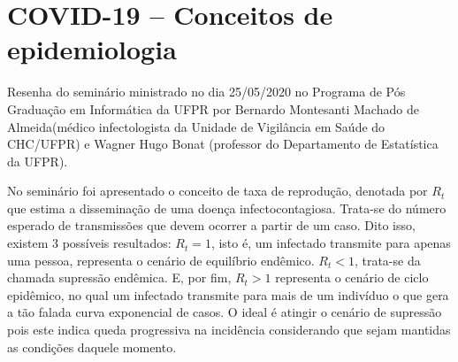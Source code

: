 \documentclass[
	12pt,				%
	openright,			%
	twoside,			%
	a4paper,			%
	english,			%
	brazil,				%
	svgnames
	]{abntex2}\usepackage[]{graphicx}\usepackage[]{color}
\newcommand{\listofquadrosname}{Lista de quadros}
\begin{document}



\tableofcontents*
\cleardoublepage

\textual

\chapter{COVID-19 – Conceitos de epidemiologia}
\label{cap:res1}


Resenha do seminário ministrado no dia 25/05/2020 no Programa de Pós Graduação em Informática da UFPR por Bernardo Montesanti Machado de Almeida(médico infectologista da Unidade de Vigilância em Saúde do CHC/UFPR) e Wagner Hugo Bonat (professor do Departamento de Estatística da UFPR).

No seminário foi apresentado o conceito de taxa de reprodução, denotada por $R_t$ que estima a disseminação de uma doença infectocontagiosa. Trata-se do número esperado de transmissões que devem ocorrer a partir de um caso. Dito isso, existem 3 possíveis resultados: $R_t = 1$, isto é, um infectado transmite para apenas uma pessoa, representa o cenário de equilíbrio endêmico. $R_t < 1$, trata-se da chamada supressão endêmica. E, por fim, $R_t > 1$ representa o cenário de ciclo epidêmico, no qual um infectado transmite para mais de um indivíduo o que gera a tão falada curva exponencial de casos. O ideal é atingir o cenário de supressão pois este indica queda progressiva na incidência considerando que sejam mantidas as condições daquele momento.
\end{document}
